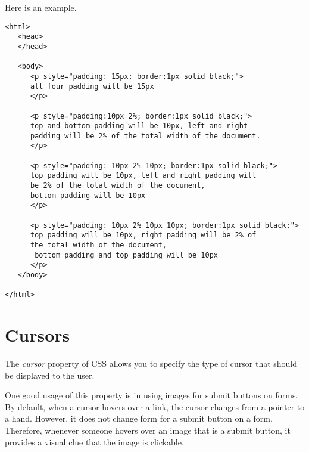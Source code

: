 \documentclass[a4paper,oneside]{book}
\numberwithin{equation}{chapter}
\begin{document}
Here is an example.
\begin{verbatim}
<html>
   <head>
   </head>
   
   <body>
      <p style="padding: 15px; border:1px solid black;">
      all four padding will be 15px 
      </p> 
      
      <p style="padding:10px 2%; border:1px solid black;"> 
      top and bottom padding will be 10px, left and right
      padding will be 2% of the total width of the document. 
      </p> 
      
      <p style="padding: 10px 2% 10px; border:1px solid black;">
      top padding will be 10px, left and right padding will 
      be 2% of the total width of the document,
      bottom padding will be 10px
      </p> 
      
      <p style="padding: 10px 2% 10px 10px; border:1px solid black;">
      top padding will be 10px, right padding will be 2% of
      the total width of the document,
       bottom padding and top padding will be 10px 
      </p>
   </body>
   
</html> 
\end{verbatim}
\section{Cursors}
The \textit{cursor} property of CSS allows you to specify the type of cursor that should be displayed to the user.

One good usage of this property is in using images for submit buttons on forms. By default, when a cursor hovers over a link, the cursor changes from a pointer to a hand. However, it does not change form for a submit button on a form. Therefore, whenever someone hovers over an image that is a submit button, it provides a visual clue that the image is clickable.
\end{document}
